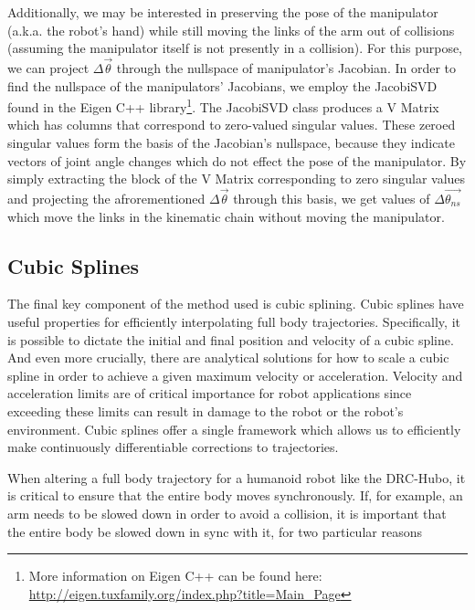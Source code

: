 \documentclass[letterpaper, 10 pt, conference]{ieeeconf}  %
\begin{document}
Additionally, we may be interested in preserving the pose of the manipulator (a.k.a. the robot's hand) while still moving the links of the arm out of collisions (assuming the manipulator itself is not presently in a collision). For this purpose, we can project $\Delta \vec{\theta}$ through the nullspace of manipulator's Jacobian. In order to find the nullspace of the manipulators' Jacobians, we employ the JacobiSVD found in the Eigen C++ library\footnote{More information on Eigen C++ can be found here: \url{http://eigen.tuxfamily.org/index.php?title=Main_Page}}. The JacobiSVD class produces a V Matrix which has columns that correspond to zero-valued singular values. These zeroed singular values form the basis of the Jacobian's nullspace, because they indicate vectors of joint angle changes which do not effect the pose of the manipulator. By simply extracting the block of the V Matrix corresponding to zero singular values and projecting the afrorementioned $\Delta \vec{\theta}$ through this basis, we get values of $\Delta \vec{\theta_{ns}}$ which move the links in the kinematic chain without moving the manipulator.

\subsection{Cubic Splines}

The final key component of the method used is cubic splining. Cubic splines have useful properties for efficiently interpolating full body trajectories. Specifically, it is possible to dictate the initial and final position and velocity of a cubic spline. And even more crucially, there are analytical solutions for how to scale a cubic spline in order to achieve a given maximum velocity or acceleration. Velocity and acceleration limits are of critical importance for robot applications since exceeding these limits can result in damage to the robot or the robot's environment. Cubic splines offer a single framework which allows us to efficiently make continuously differentiable corrections to trajectories.

When altering a full body trajectory for a humanoid robot like the DRC-Hubo, it is critical to ensure that the entire body moves synchronously. If, for example, an arm needs to be slowed down in order to avoid a collision, it is important that the entire body be slowed down in sync with it, for two particular reasons
\end{document}
